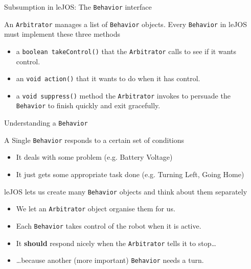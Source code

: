 \documentclass[color=pdftex,usenames,dvipsnames, aspectratio=169]{beamer}
\begin{document}
\begin{frame}[fragile]{Subsumption in leJOS: The \lstinline!Behavior! interface}
\begin{block}{An \lstinline[identifierstyle=\bfseries\color{yellow}]!Arbitrator! manages a list of \lstinline[identifierstyle=\bfseries\color{yellow}]!Behavior! objects.}
Every \lstinline!Behavior! in leJOS must implement these three methods
\begin{itemize}
\item a \lstinline!boolean takeControl()! that the \lstinline!Arbitrator! calls to see if it wants control.
\item an \lstinline!void action()! that it wants to do when it has control.
\item a \lstinline!void suppress()! method the \lstinline!Arbitrator! invokes to persuade the \lstinline!Behavior! to finish quickly and exit gracefully.
\end{itemize}
\end{block}
\end{frame}

\begin{frame}{Understanding a \lstinline!Behavior!}
\begin{block}{A Single \lstinline[identifierstyle=\bfseries\color{yellow}]!Behavior! responds to a certain set of conditions}
\begin{itemize}
    \item \textcolor{BrickRed}{It deals with some problem} (e.g. Battery Voltage)
    \item \textcolor{OliveGreen}{It just gets some appropriate task done} (e.g. Turning Left, Going Home)
\end{itemize}
\end{block}

\begin{block}{leJOS lets us create many \lstinline[identifierstyle=\bfseries\color{yellow}]!Behavior! objects and think about them separately}
\begin{itemize}
\item  We let an \lstinline!Arbitrator! object organise them for us.
\item Each \lstinline!Behavior! takes control of the robot when it is active.
\item It \textbf{should} respond nicely when the \lstinline!Arbitrator! tells it to stop\ldots 
\item \ldots because another (more important) \lstinline!Behavior! needs a turn.
\end{itemize}
\end{block}
\end{frame}
\end{document}
